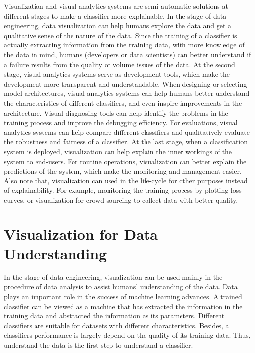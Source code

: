 Visualization and visual analytics systems are semi-automatic solutions at different stages to make a classifier more explainable. In the stage of data engineering, data visualization can help humans explore the data and get a qualitative sense of the nature of the data. Since the training of a classifier is actually extracting information from the training data, with more knowledge of the data in mind, humans (\ie developers or data scientists) can better understand if a failure results from the quality or volume issues of the data. At the second stage, visual analytics systems serve as development tools, which make the development more transparent and understandable. When designing or selecting model architectures, visual analytics systems can help humans better understand the characteristics of different classifiers, and even inspire improvements in the architecture. Visual diagnosing tools can help identify the problems in the training process and improve the debugging efficiency. For evaluations, visual analytics systems can help compare different classifiers and qualitatively evaluate the robustness and fairness of a classifier. At the last stage, when a classification system is deployed, visualization can help explain the inner workings of the system to end-users. For routine operations, visualization can better explain the predictions of the system, which make the monitoring and management easier. Also note that, visualization can used in the life-cycle for other purposes instead of explainability. For example, monitoring the training process by plotting loss curves, or visualization for crowd sourcing to collect data with better quality.




\section{Visualization for Data Understanding}

In the stage of data engineering, visualization can be used mainly in the procedure of data analysis to assist humans' understanding of the data. Data plays an important role in the success of machine learning advances. A trained classifier can be viewed as a machine that has extracted the information in the training data and abstracted the information as its parameters. Different classifiers are suitable for datasets with different characteristics. Besides, a classifiers performance is largely depend on the quality of its training data. Thus, understand the data is the first step to understand a classifier.

